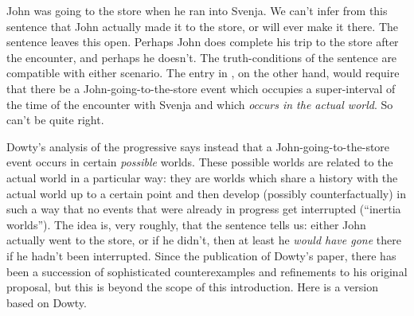 \ex {}%
John was going to the store when he ran into Svenja.\label{ex:interrupt} \xe
%
We can't infer from this sentence that John actually made it to the store, or
will ever make it there. The sentence leaves this open. Perhaps John does
complete his trip to the store after the encounter, and perhaps he doesn't. The
truth-conditions of the sentence \Last are compatible with either scenario. The
entry in \LLast, on the other hand, would require that there be a
John-going-to-the-store event which occupies a super-interval of the time of the
encounter with Svenja and which \emph{occurs in the actual world}. So \LLast
can't be quite right.

Dowty's analysis of the progressive says instead that a John-going-to-the-store
event occurs in certain \emph{possible} worlds. These possible worlds are
related to the actual world in a particular way: they are worlds which share a
history with the actual world up to a certain point and then develop (possibly
counterfactually) in such a way that no events that were already in progress get
interrupted (``inertia worlds''). The idea is, very roughly, that the sentence
tells us: either John actually went to the store, or if he didn't, then at least
he \emph{would have gone} there if he hadn't been interrupted. %
%
Since the publication of Dowty's paper, there has been a succession of
sophisticated counterexamples and refinements to his original proposal, but this
is beyond the scope of this introduction. Here is a version based on Dowty.

